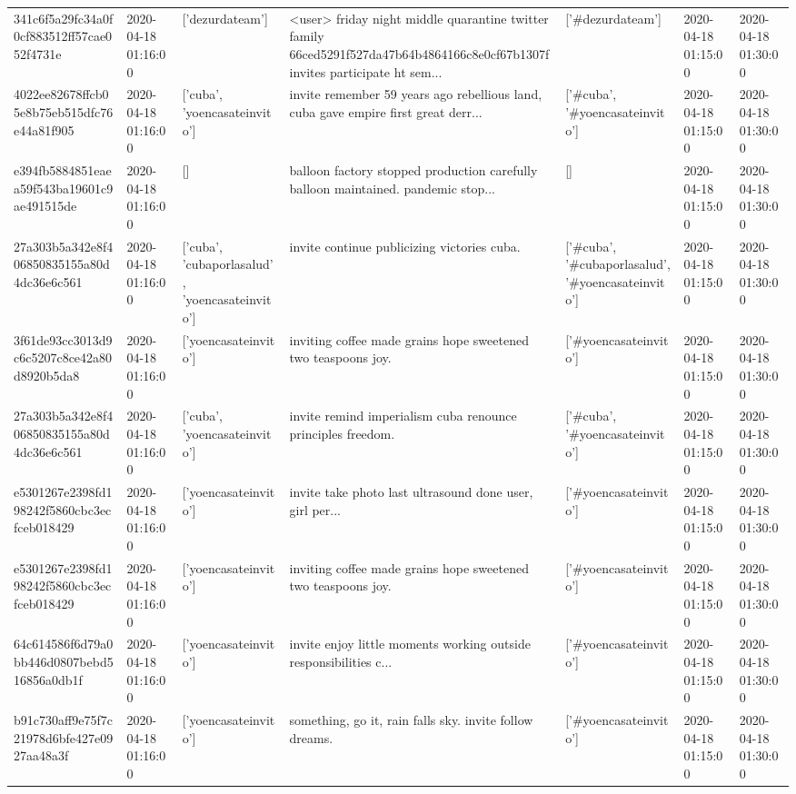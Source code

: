 \begin{tabular}{lllllll}
341c6f5a29fc34a0f0cf883512ff57cae052f4731e & 2020-04-18 01:16:00 & ['dezurdateam'] & <user> friday night middle quarantine twitter family 66ced5291f527da47b64b4864166c8e0cf67b1307f invites participate ht sem... & ['#dezurdateam'] & 2020-04-18 01:15:00 & 2020-04-18 01:30:00 \\
4022ee82678ffcb05e8b75eb515dfc76e44a81f905 & 2020-04-18 01:16:00 & ['cuba', 'yoencasateinvito'] & invite remember 59 years ago rebellious land, cuba gave empire first great derr... & ['#cuba', '#yoencasateinvito'] & 2020-04-18 01:15:00 & 2020-04-18 01:30:00 \\
e394fb5884851eaea59f543ba19601c9ae491515de & 2020-04-18 01:16:00 & [] & balloon factory stopped production carefully balloon maintained. pandemic stop... & [] & 2020-04-18 01:15:00 & 2020-04-18 01:30:00 \\
27a303b5a342e8f406850835155a80d4dc36e6c561 & 2020-04-18 01:16:00 & ['cuba', 'cubaporlasalud', 'yoencasateinvito'] & invite continue publicizing victories cuba. & ['#cuba', '#cubaporlasalud', '#yoencasateinvito'] & 2020-04-18 01:15:00 & 2020-04-18 01:30:00 \\
3f61de93cc3013d9c6c5207c8ce42a80d8920b5da8 & 2020-04-18 01:16:00 & ['yoencasateinvito'] & inviting coffee made grains hope sweetened two teaspoons joy. & ['#yoencasateinvito'] & 2020-04-18 01:15:00 & 2020-04-18 01:30:00 \\
27a303b5a342e8f406850835155a80d4dc36e6c561 & 2020-04-18 01:16:00 & ['cuba', 'yoencasateinvito'] & invite remind imperialism cuba renounce principles freedom. & ['#cuba', '#yoencasateinvito'] & 2020-04-18 01:15:00 & 2020-04-18 01:30:00 \\
e5301267e2398fd198242f5860cbc3ecfceb018429 & 2020-04-18 01:16:00 & ['yoencasateinvito'] & invite take photo last ultrasound done user, girl per... & ['#yoencasateinvito'] & 2020-04-18 01:15:00 & 2020-04-18 01:30:00 \\
e5301267e2398fd198242f5860cbc3ecfceb018429 & 2020-04-18 01:16:00 & ['yoencasateinvito'] & inviting coffee made grains hope sweetened two teaspoons joy. & ['#yoencasateinvito'] & 2020-04-18 01:15:00 & 2020-04-18 01:30:00 \\
64c614586f6d79a0bb446d0807bebd516856a0db1f & 2020-04-18 01:16:00 & ['yoencasateinvito'] & invite enjoy little moments working outside responsibilities c... & ['#yoencasateinvito'] & 2020-04-18 01:15:00 & 2020-04-18 01:30:00 \\
b91c730aff9e75f7c21978d6bfe427e0927aa48a3f & 2020-04-18 01:16:00 & ['yoencasateinvito'] & something, go it, rain falls sky. invite follow dreams. & ['#yoencasateinvito'] & 2020-04-18 01:15:00 & 2020-04-18 01:30:00 \\

\end{tabular}
